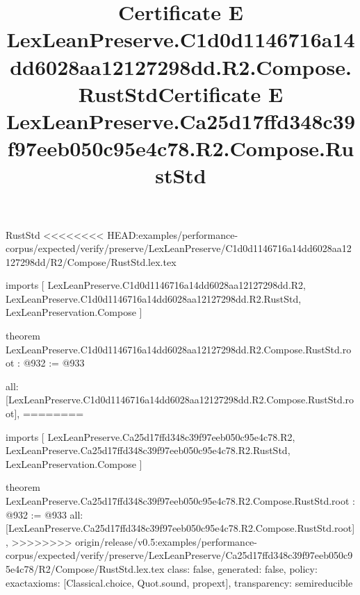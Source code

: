 \begin{lexlean}{RustStd}
<<<<<<<< HEAD:examples/performance-corpus/expected/verify/preserve/LexLeanPreserve/C1d0d1146716a14dd6028aa12127298dd/R2/Compose/RustStd.lex.tex
\title{Certificate E LexLeanPreserve.C1d0d1146716a14dd6028aa12127298dd.R2.Compose.RustStd}
\begin{coremodule}
imports [
  LexLeanPreserve.C1d0d1146716a14dd6028aa12127298dd.R2,
  LexLeanPreserve.C1d0d1146716a14dd6028aa12127298dd.R2.RustStd,
  LexLeanPreservation.Compose
]

theorem LexLeanPreserve.C1d0d1146716a14dd6028aa12127298dd.R2.Compose.RustStd.root : @932 := @933 {
  all: [LexLeanPreserve.C1d0d1146716a14dd6028aa12127298dd.R2.Compose.RustStd.root],
========
\title{Certificate E LexLeanPreserve.Ca25d17ffd348c39f97eeb050c95e4c78.R2.Compose.RustStd}
\begin{coremodule}
imports [
  LexLeanPreserve.Ca25d17ffd348c39f97eeb050c95e4c78.R2,
  LexLeanPreserve.Ca25d17ffd348c39f97eeb050c95e4c78.R2.RustStd,
  LexLeanPreservation.Compose
]

theorem LexLeanPreserve.Ca25d17ffd348c39f97eeb050c95e4c78.R2.Compose.RustStd.root : @932 := @933 {
  all: [LexLeanPreserve.Ca25d17ffd348c39f97eeb050c95e4c78.R2.Compose.RustStd.root],
>>>>>>>> origin/release/v0.5:examples/performance-corpus/expected/verify/preserve/LexLeanPreserve/Ca25d17ffd348c39f97eeb050c95e4c78/R2/Compose/RustStd.lex.tex
  class: false,
  generated: false,
  policy: exact{axioms: [Classical.choice, Quot.sound, propext]},
  transparency: semireducible
}


\end{coremodule}}
\end{coremodule}
\end{lexlean}
